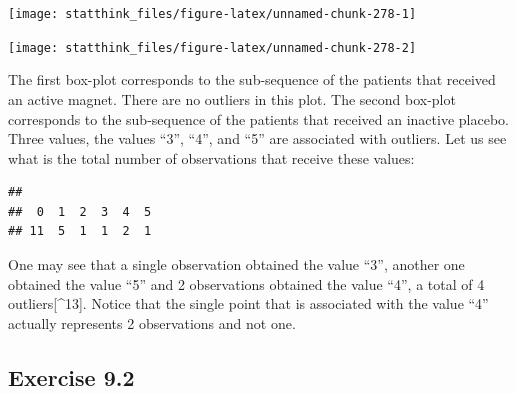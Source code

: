 \documentclass[]{krantz}
\makeatletter
\newenvironment{Shaded}{\begin{snugshade}}{\end{snugshade}}
\newcommand{\KeywordTok}[1]{\textcolor[rgb]{0.13,0.29,0.53}{\textbf{#1}}}
\newcommand{\DecValTok}[1]{\textcolor[rgb]{0.00,0.00,0.81}{#1}}
\newcommand{\OperatorTok}[1]{\textcolor[rgb]{0.81,0.36,0.00}{\textbf{#1}}}
\newcommand{\NormalTok}[1]{#1}
\newenvironment{kframe}{%
\medskip{}
\setlength{\fboxsep}{.8em}
 \def\at@end@of@kframe{}%
 \ifinner\ifhmode%
  \def\at@end@of@kframe{\end{minipage}}%
  \begin{minipage}{\columnwidth}%
 \fi\fi%
 \def\FrameCommand##1{\hskip\@totalleftmargin \hskip-\fboxsep
 \colorbox{shadecolor}{##1}\hskip-\fboxsep
     \hskip-\linewidth \hskip-\@totalleftmargin \hskip\columnwidth}%
 \MakeFramed {\advance\hsize-\width
   \@totalleftmargin\z@ \linewidth\hsize
   \@setminipage}}%
 {\par\unskip\endMakeFramed%
 \at@end@of@kframe}
\renewenvironment{Shaded}{\begin{kframe}}{\end{kframe}}
\theoremstyle{definition}
\theoremstyle{definition}
\theoremstyle{definition}
\theoremstyle{remark}
\makeatother
\begin{document}
\begin{enumerate}
  \begin{center}\texttt{[image: statthink\_files/figure-latex/unnamed-chunk-278-1]} \end{center}

\begin{Shaded}
\end{Shaded}

  \begin{center}\texttt{[image: statthink\_files/figure-latex/unnamed-chunk-278-2]} \end{center}

  The first box-plot corresponds to the sub-sequence of the patients
  that received an active magnet. There are no outliers in this plot.
  The second box-plot corresponds to the sub-sequence of the patients
  that received an inactive placebo. Three values, the values ``3'',
  ``4'', and ``5'' are associated with outliers. Let us see what is the
  total number of observations that receive these values:

\begin{Shaded}
\end{Shaded}

\begin{verbatim}
## 
##  0  1  2  3  4  5 
## 11  5  1  1  2  1
\end{verbatim}

  One may see that a single observation obtained the value ``3'',
  another one obtained the value ``5'' and 2 observations obtained the
  value ``4'', a total of 4 outliers{[}\^{}13{]}. Notice that the single
  point that is associated with the value ``4'' actually represents 2
  observations and not one.
\end{enumerate}

\subsection*{Exercise 9.2}\label{exercise-9.2}
\end{document}

